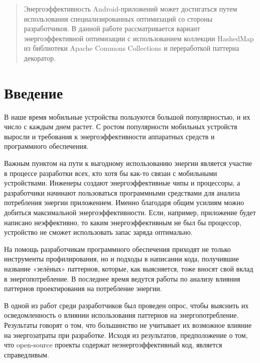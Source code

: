 \documentclass{math-mech-sci}
\begin{document}
\maketitle

\begin{abstract}
    Энергоэффективность Android-приложений может достигаться путем использования специализированных оптимизаций со стороны разработчиков. В данной работе рассматривается вариант энергоэффективной оптимизации с использованием коллекции HashedMap из библиотеки Apache Commons Collections и переработкой паттерна декоратор.
\end{abstract}

\section{Введение}
    В наше время мобильные устройства пользуются большой популярностью, и их число с каждым днем растет. С ростом популярности мобильных устройств выросли и требования к энергоэффективности аппаратных средств и программного обеспечения.

    Важным пунктом на пути к выгодному использованию энергии является участие в процессе разработки всех, кто хотя бы как-то связан с мобильными устройствами. Инженеры создают энергоэффективные чипы и процессоры, а разработчики начинают пользоваться программными средствами для анализа потребления энергии приложением. Именно благодаря общим усилиям можно добиться максимальной энергоэффективности. Если, например, приложение будет написано неэффективно, то каким энергоэффективным не был бы процессор, устройство не сможет использовать запас заряда оптимально.

    На помощь разработчикам программного обеспечения приходят не только инструменты профилирования, но и подходы в написании кода, получившие название «зелёных» паттернов, которые, как выясняется, тоже вносят свой вклад в энергопотребление. В последнее время ведутся работы по анализу влияния паттернов проектирования на потребление энергии.

    В одной из работ \cite{9825870} среди разработчиков был проведен опрос, чтобы выяснить их осведомленность о влиянии использования паттернов на энергопотребление. Результаты говорят о том, что большинство не учитывает их возможное влияние на энергозатраты при разработке. Исходя из результатов, предположение о том, что open-source проекты содержат неэнергоэффективный код, является справедливым. 
\end{document}
